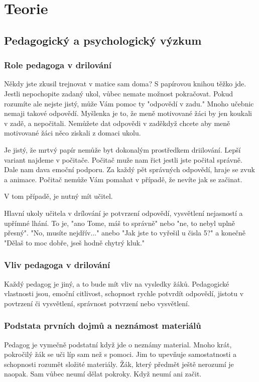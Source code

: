 \chapter{Teorie}

\section{Pedagogický a psychologický výzkum}

\subsection{Role pedagoga v drilování}
Někdy jste zkusil trejnovat v matice sam doma?  S papírovou knihou těžko jde.  Jestli nepochopite zadaný ukol, vůbec nemate možnost pokračovat.  Pokud rozumíte ale nejste jistý, může Vám pomoc ty "odpovědí v zadu."  Mnoho učebnic nemaji takové odpovědí.  Myšlenka je to, že meně motivované žáci by jen koukali v zadě, a nepočitali.  Nemůžete dat odpovědi v zaděkdyž chcete aby meně motivované žáci něco ziskali z domaci ukolu.

Je jistý, že mrtvý papír nemůže byt dokonalým prostředkem driilování.  Lepší variant najdeme v počitače.  Počitač muže nam řict jestli jste počital správně.  Dale nam dava emoční podporu.  Za každý pět správných odpovědí, hraje se zvuk a animace. Počitač nemůže Vám pomahat v případě, že nevíte jak se začinat.

V tom případě, je nutný mít učitel.

Hlavní ukoly učitela v drílování je potvrzení odpovědí, vysvětlení nejasností a upřímné lhání.  To je, "ano Tome, máš to správně" nebo "ne, to nebyl uplně přesný". "No, musíte nejdřív..." anebo "Jak jste to vyřešil u čisla 5?" a konečně "Dělaš to moc dobře, jseš hodně chytrý kluk."

\subsection{Vliv pedagoga v drilování}
Každý pedagog je jiný, a to bude mít vliv na vysledky žáků.  Pedagogické vlastnosti jsou, emoční citlivost, schopnost rychle potvrdít odpovědí, jistotu v povtrzení či vysvětlení, správnost potvrzení nebo vysvětlení.

\subsection{Podstata prvních dojmů a neznámost materiálů}
Pedagog je vymečně podstatní když jde o neznámy material.  Mnoho krát, pokročilý žák se uči líp sam než s pomoci.  Jim to upevňuje samostatnosti a schopnosti rozumět složité materiály.  Žák, který předmět ještě nerozumí je naopak. Sam vůbec neumí dělat pokroky.  Když neumí ani začit.

